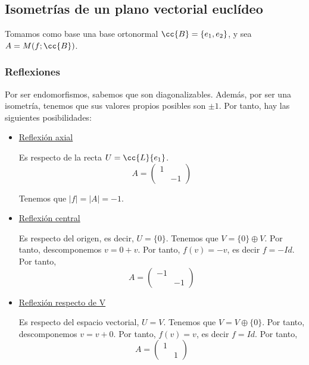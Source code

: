 \subsection{Isometrías de un plano vectorial euclídeo}
Tomamos como base una base ortonormal $\cc{B}=\{e_1, e_2\}$, y sea $A=M(f; \cc{B})$.
\subsubsection{Reflexiones}
Por ser endomorfismos, sabemos que son diagonalizables. Además, por ser una isometría, tenemos que sus valores propios posibles son $\pm 1$. Por tanto, hay las siguientes posibilidades:
\begin{itemize}
    \item \underline{Reflexión axial}

    Es respecto de la recta $U=\cc{L}\{e_1\}$.
    \begin{equation*}
        A=\left(\begin{array}{cc}
            1 &  \\
             & -1
        \end{array}\right)
    \end{equation*}

    Tenemos que $|f|=|A|=-1$.

    \item \underline{Reflexión central}

    Es respecto del origen, es decir, $U=\{0\}$. Tenemos que $V=\{0\}\oplus V$. Por tanto, descomponemos $v=0+v$. Por tanto, $f(v)=-v$, es decir $f=-Id$. Por tanto,
    \begin{equation*}
        A=\left(\begin{array}{cc}
            -1 &  \\
             & -1
        \end{array}\right)
    \end{equation*}

    \item \underline{Reflexión respecto de V}

    Es respecto del espacio vectorial, $U=V$. Tenemos que $V=V \oplus \{0\}$. Por tanto, descomponemos $v=v+0$. Por tanto, $f(v)=v$, es decir $f=Id$. Por tanto,
    \begin{equation*}
        A=\left(\begin{array}{cc}
            1 &  \\
             & 1
        \end{array}\right)
    \end{equation*}
\end{itemize}


